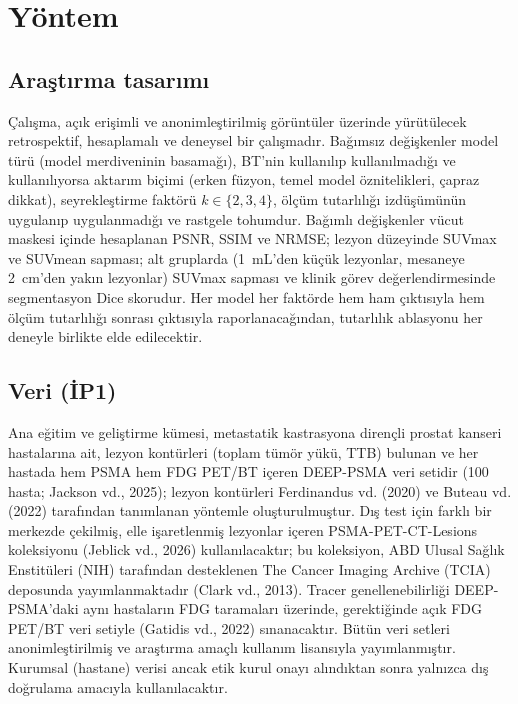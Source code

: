 \documentclass[11pt,a4paper]{article}
\begin{document}
\section{Yöntem}

\subsection{Araştırma tasarımı}
Çalışma, açık erişimli ve anonimleştirilmiş görüntüler üzerinde yürütülecek retrospektif,
hesaplamalı ve deneysel bir çalışmadır. Bağımsız değişkenler model türü (model merdiveninin
basamağı), BT'nin kullanılıp kullanılmadığı ve kullanılıyorsa aktarım biçimi (erken füzyon, temel
model öznitelikleri, çapraz dikkat), seyrekleştirme faktörü $k \in \{2, 3, 4\}$, ölçüm
tutarlılığı izdüşümünün uygulanıp uygulanmadığı ve rastgele tohumdur. Bağımlı değişkenler vücut
maskesi içinde hesaplanan PSNR, SSIM ve NRMSE; lezyon düzeyinde SUVmax ve SUVmean sapması; alt
gruplarda (1~mL'den küçük lezyonlar, mesaneye 2~cm'den yakın lezyonlar) SUVmax sapması ve klinik
görev değerlendirmesinde segmentasyon Dice skorudur. Her model her faktörde hem ham çıktısıyla hem
ölçüm tutarlılığı sonrası çıktısıyla raporlanacağından, tutarlılık ablasyonu her deneyle birlikte
elde edilecektir.

\subsection{Veri (İP1)}
Ana eğitim ve geliştirme kümesi, metastatik kastrasyona dirençli prostat kanseri hastalarına ait,
lezyon kontürleri (toplam tümör yükü, TTB) bulunan ve her hastada hem PSMA hem FDG PET/BT içeren
DEEP-PSMA veri setidir (100 hasta; Jackson vd., 2025); lezyon kontürleri Ferdinandus vd. (2020) ve
Buteau vd. (2022) tarafından tanımlanan yöntemle oluşturulmuştur. Dış test için farklı bir
merkezde çekilmiş, elle işaretlenmiş lezyonlar içeren PSMA-PET-CT-Lesions koleksiyonu (Jeblick
vd., 2026) kullanılacaktır; bu koleksiyon, ABD Ulusal Sağlık Enstitüleri (NIH) tarafından
desteklenen The Cancer Imaging Archive (TCIA) deposunda yayımlanmaktadır (Clark vd., 2013).
Tracer genellenebilirliği DEEP-PSMA'daki aynı hastaların FDG taramaları üzerinde, gerektiğinde
açık FDG PET/BT veri setiyle (Gatidis vd., 2022) sınanacaktır. Bütün veri setleri
anonimleştirilmiş ve araştırma amaçlı kullanım lisansıyla yayımlanmıştır. Kurumsal (hastane)
verisi ancak etik kurul onayı alındıktan sonra yalnızca dış doğrulama amacıyla kullanılacaktır.
\end{document}
